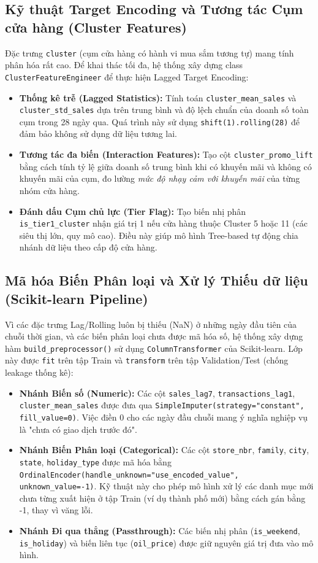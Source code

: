 \documentclass[12pt,a4paper]{report}
\begin{document}
\subsection{Kỹ thuật Target Encoding và Tương tác Cụm cửa hàng (Cluster Features)}
Đặc trưng \texttt{cluster} (cụm cửa hàng có hành vi mua sắm tương tự) mang tính phân hóa rất cao. Để khai thác tối đa, hệ thống xây dựng class \texttt{ClusterFeatureEngineer} để thực hiện Lagged Target Encoding:
\begin{itemize}
    \item \textbf{Thống kê trễ (Lagged Statistics):} Tính toán \texttt{cluster\_mean\_sales} và \texttt{cluster\_std\_sales} dựa trên trung bình và độ lệch chuẩn của doanh số toàn cụm trong 28 ngày qua. Quá trình này sử dụng \texttt{shift(1).rolling(28)} để đảm bảo không sử dụng dữ liệu tương lai.
    \item \textbf{Tương tác đa biến (Interaction Features):} Tạo cột \texttt{cluster\_promo\_lift} bằng cách tính tỷ lệ giữa doanh số trung bình khi có khuyến mãi và không có khuyến mãi của cụm, đo lường \textit{mức độ nhạy cảm với khuyến mãi} của từng nhóm cửa hàng.
    \item \textbf{Đánh dấu Cụm chủ lực (Tier Flag):} Tạo biến nhị phân \texttt{is\_tier1\_cluster} nhận giá trị 1 nếu cửa hàng thuộc Cluster 5 hoặc 11 (các siêu thị lớn, quy mô cao). Điều này giúp mô hình Tree-based tự động chia nhánh dữ liệu theo cấp độ cửa hàng.
\end{itemize}

\subsection{Mã hóa Biến Phân loại và Xử lý Thiếu dữ liệu (Scikit-learn Pipeline)}
Vì các đặc trưng Lag/Rolling luôn bị thiếu (NaN) ở những ngày đầu tiên của chuỗi thời gian, và các biến phân loại chưa được mã hóa số, hệ thống xây dựng hàm \texttt{build\_preprocessor()} sử dụng \texttt{ColumnTransformer} của Scikit-learn. Lớp này được \texttt{fit} trên tập Train và \texttt{transform} trên tập Validation/Test (chống leakage thống kê):
\begin{itemize}
    \item \textbf{Nhánh Biến số (Numeric):} Các cột \texttt{sales\_lag7}, \texttt{transactions\_lag1}, \texttt{cluster\_mean\_sales} được đưa qua \texttt{SimpleImputer(strategy="constant", fill\_value=0)}. Việc điền 0 cho các ngày đầu chuỗi mang ý nghĩa nghiệp vụ là "chưa có giao dịch trước đó".
    \item \textbf{Nhánh Biến Phân loại (Categorical):} Các cột \texttt{store\_nbr}, \texttt{family}, \texttt{city}, \texttt{state}, \texttt{holiday\_type} được mã hóa bằng \texttt{OrdinalEncoder(handle\_unknown="use\_encoded\_value", unknown\_value=-1)}. Kỹ thuật này cho phép mô hình xử lý các danh mục mới chưa từng xuất hiện ở tập Train (ví dụ thành phố mới) bằng cách gán bằng -1, thay vì văng lỗi.
    \item \textbf{Nhánh Đi qua thẳng (Passthrough):} Các biến nhị phân (\texttt{is\_weekend}, \texttt{is\_holiday}) và biến liên tục (\texttt{oil\_price}) được giữ nguyên giá trị đưa vào mô hình.
\end{itemize}
\end{document}
